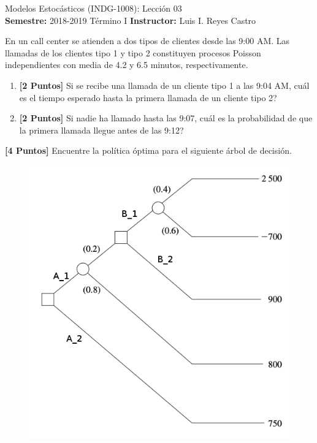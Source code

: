 \documentclass[ a4paper, twoside, 11pt]{article}
\newcommand{\numero}{03}
\begin{document}
\allowdisplaybreaks



\begin{center}
\Large Modelos Estoc\'asticos (INDG-1008): Lecci\'on \numero \\[1ex]
\small \textbf{Semestre:} 2018-2019 T\'ermino I \qquad
\textbf{Instructor:} Luis I. Reyes Castro
\end{center}
\fullskip

\begin{problem}
En un call center se atienden a dos tipos de clientes desde las 9:00 AM. \linebreak Las llamadas de los clientes tipo 1 y tipo 2 constituyen procesos Poisson independientes con media de 4.2 y 6.5 minutos, respectivamente. 
\begin{enumerate}[label=\textbf{\alph*)}]
\item \textbf{[2 Puntos]} Si se recibe una llamada de un cliente tipo 1 a las 9:04 AM, cu\'al es el tiempo esperado hasta la primera llamada de un cliente tipo 2?
\item \textbf{[2 Puntos]} Si nadie ha llamado hasta las 9:07, cu\'al es la probabilidad de que la primera llamada llegue antes de las 9:12?
\end{enumerate}

\end{problem}
\fullskip

\begin{problem}
\textbf{[4 Puntos]} Encuentre la pol\'itica \'optima para el siguiente \'arbol de decisi\'on. 

\begin{figure}[htb]
\centering
\includegraphics[width=0.6\columnwidth]{problema_arbol-decision.jpg}
\end{figure}

\end{problem}
\fullskip
\end{document}
